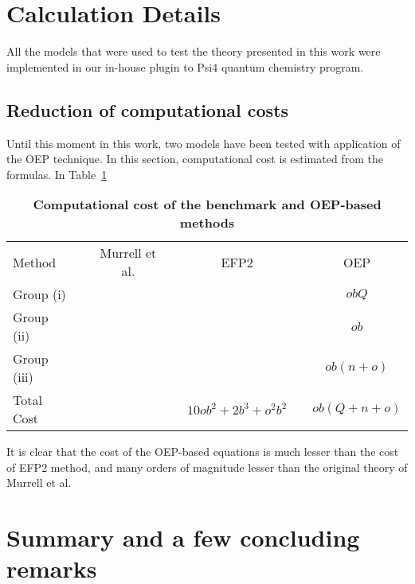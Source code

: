 \section{\label{s:4}Calculation Details}

All the models that were used to test the theory presented in this work
were implemented in our in\hyp{}house plugin to {\sc Psi4} quantum chemistry program.\cite{Psi4.JCTC.2017}


\subsection{\label{s:413s6}Reduction of computational costs}

Until this moment in this work, two models have been tested with application of the OEP technique.
In this section, computational cost is estimated from the formulas.
In
Table~\ref{t:oep-costs} 
%
{
\renewcommand{\arraystretch}{1.4}
\begin{table}[b]
\caption[Computational cost of the benchmark and OEP-based methods: calculation of coupling constant]
{{\bf Computational cost of the benchmark and OEP-based methods\footnotemark[1]}
}
\label{t:oep-costs}
\begin{ruledtabular}
\begin{tabular}{lcccccc}
Method             && Murrell et al. &&    EFP2        &&      OEP     \\ 
	\cline{1-7}
Group (i)         &&  &&        &&   $obQ$     \\
Group (ii)        &&  &&        &&   $ob$      \\
Group (iii)       &&  &&        &&   $ob(n+o)$     \\
Total Cost        &&  && $10ob^2 + 2b^3 + o^2b^2$       &&   $ob(Q+n+o)$     \\
\end{tabular}
\end{ruledtabular}
%
%
\end{table}
}
%
It is clear that the cost of the OEP\hyp{}based equations is much lesser than the cost of EFP2 method,
and many orders of magnitude lesser than the original theory of Murrell et al.


\section{\label{s:6}Summary and a few concluding remarks}

